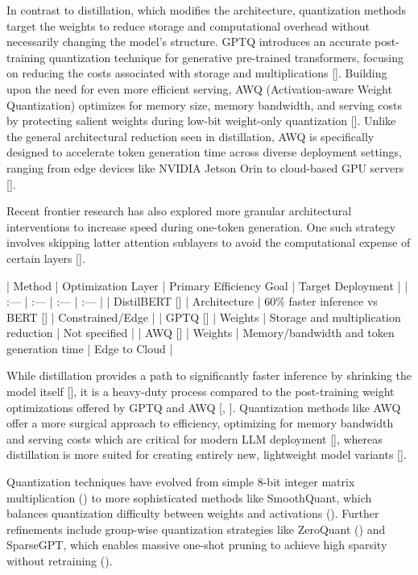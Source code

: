 \documentclass[11pt]{article}
\begin{document}
In contrast to distillation, which modifies the architecture, quantization methods target the weights to reduce storage and computational overhead without necessarily changing the model's structure. GPTQ introduces an accurate post-training quantization technique for generative pre-trained transformers, focusing on reducing the costs associated with storage and multiplications [\citep{2210.17323}]. Building upon the need for even more efficient serving, AWQ (Activation-aware Weight Quantization) optimizes for memory size, memory bandwidth, and serving costs by protecting salient weights during low-bit weight-only quantization [\citep{2306.00978}]. Unlike the general architectural reduction seen in distillation, AWQ is specifically designed to accelerate token generation time across diverse deployment settings, ranging from edge devices like NVIDIA Jetson Orin to cloud-based GPU servers [\citep{2306.00978}].

Recent frontier research has also explored more granular architectural interventions to increase speed during one-token generation. One such strategy involves skipping latter attention sublayers to avoid the computational expense of certain layers [\citep{2404.05741}].

| Method | Optimization Layer | Primary Efficiency Goal | Target Deployment |
| :--- | :--- | :--- | :--- |
| DistilBERT [\citep{1910.01108}] | Architecture | 60\% faster inference vs BERT [\citep{1706.03762}] | Constrained/Edge |
| GPTQ [\citep{2210.17323}] | Weights | Storage and multiplication reduction | Not specified |
| AWQ [\citep{2306.00978}] | Weights | Memory/bandwidth and token generation time | Edge to Cloud |

While distillation provides a path to significantly faster inference by shrinking the model itself [\citep{1910.01108}], it is a heavy-duty process compared to the post-training weight optimizations offered by GPTQ and AWQ [\citep{2210.17323}, \citep{2306.00978}]. Quantization methods like AWQ offer a more surgical approach to efficiency, optimizing for memory bandwidth and serving costs which are critical for modern LLM deployment [\citep{2306.00978}], whereas distillation is more suited for creating entirely new, lightweight model variants [\citep{1503.02531}].

Quantization techniques have evolved from simple 8-bit integer matrix multiplication (\citep{2211.10438}) to more sophisticated methods like SmoothQuant, which balances quantization difficulty between weights and activations (\citep{2211.10438}). Further refinements include group-wise quantization strategies like ZeroQuant (\citep{2206.01861}) and SparseGPT, which enables massive one-shot pruning to achieve high sparsity without retraining (\citep{2301.00774}).
\end{document}
